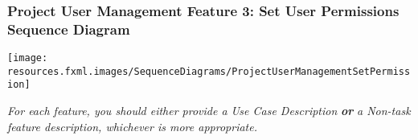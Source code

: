 \documentclass[twoside,letterpaper]{article}
\begin{document}
\subsubsection[Project User Management Feature 3: Set User Permissions Sequence Diagram]{\rmfamily\bfseries\color{black}
	Project User Management Feature 3: Set User Permissions Sequence Diagram}
\hypertarget{RefHeading22059017292}{}
\texttt{[image: resources.fxml.images/SequenceDiagrams/ProjectUserManagementSetPermission]}
\newpage




{\color{black}
	\foreignlanguage{english}{\textit{For each feature, you should either provide a Use Case Description
		}}\foreignlanguage{english}{\textbf{\textit{or}}}\foreignlanguage{english}{\textit{ a Non-task feature description,
		whichever is more appropriate.}}}
\newpage
\end{document}

